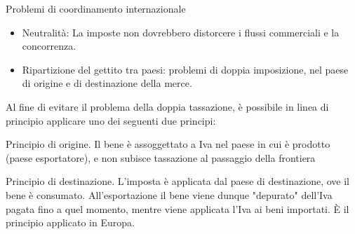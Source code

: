 \documentclass[aspectratio=149,11pt,italian]{beamer}
\begin{document}
\begin{frame}{Problemi di coordinamento internazionale}

  \begin{itemize}
  \item \alert{Neutralità:} La imposte non dovrebbero distorcere i flussi
    commerciali e la concorrenza.
  \item \alert{Ripartizione del gettito tra paesi:} problemi di doppia
    imposizione, nel paese di origine e di destinazione della merce.
  \end{itemize}

  Al fine di evitare il problema della doppia tassazione, è possibile
  in linea di principio applicare uno dei seguenti due principi:
  \begin{block}{Principio di origine.} Il bene è assoggettato a Iva nel paese
    in cui è prodotto (paese esportatore), e non subisce tassazione al
    passaggio della frontiera
\end{block}
\begin{block}{Principio di destinazione.} L'imposta è applicata dal paese di
  destinazione, ove il bene è consumato.  All'esportazione il bene viene
  dunque "depurato" dell'Iva pagata fino a quel momento, mentre viene
  applicata l'Iva ai beni importati.  È il principio applicato in Europa.
\end{block}
\end{frame}
\end{document}
